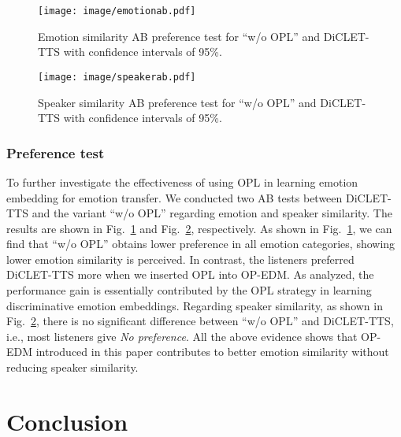 \documentclass[journal,comsoc]{IEEEtran}
\begin{document}
\begin{figure}[t]
\begin{minipage}[b]{1.0\linewidth}
  \centering
  \centerline{\texttt{[image: image/emotionab.pdf]}}
 \vspace{-0.2cm}
  \caption{Emotion similarity AB preference test for ``w/o OPL'' and DiCLET-TTS with confidence intervals of 95\%.}
  \label{fig:abemo}
 \end{minipage}
\vspace{-0.2cm} 
\end{figure}

\begin{figure}[t]
\begin{minipage}[b]{1.0\linewidth}
  \centering
  \centerline{\texttt{[image: image/speakerab.pdf]}}
 \vspace{-0.2cm}
  \caption{Speaker similarity AB preference test for ``w/o OPL'' and DiCLET-TTS with confidence intervals of 95\%.}
  \label{fig:abspk}
 \end{minipage}
\end{figure}

\subsubsection{Preference test}
To further investigate the effectiveness of using OPL in learning emotion embedding for emotion transfer.
We conducted two AB tests between DiCLET-TTS and the variant ``w/o OPL'' regarding emotion and speaker similarity.
The results are shown in Fig.~\ref{fig:abemo} and Fig.~\ref{fig:abspk}, respectively.
As shown in Fig.~\ref{fig:abemo}, we can find that ``w/o OPL'' obtains lower preference in all emotion categories, showing lower emotion similarity is perceived.
In contrast, the listeners preferred DiCLET-TTS more when we inserted OPL into OP-EDM. 
As analyzed, the performance gain is essentially contributed by the OPL strategy in learning discriminative emotion embeddings.
Regarding speaker similarity, as shown in Fig.~\ref{fig:abspk}, there is no significant difference between ``w/o OPL'' and DiCLET-TTS, i.e., most listeners give \textit{No preference}. 
All the above evidence shows that OP-EDM introduced in this paper contributes to better emotion similarity without reducing speaker similarity.

\section{Conclusion}
\label{sc:conclusion}
\end{document}
